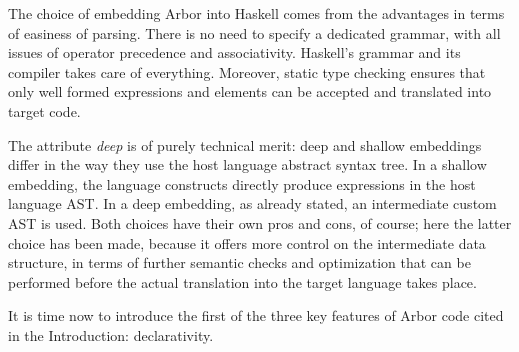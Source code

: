 \documentclass[12pt]{article} %
\newcommand{\abs}{abstract syntax tree}
\newcommand{\ABS}{AST}
\newcommand{\A}{Arbor}
\newcommand{\Hs}{Haskell}
\begin{document}
The choice of embedding \A{} into \Hs{} comes from the advantages in terms of easiness of parsing. There is no need to specify a dedicated grammar, with all issues of operator precedence and associativity. \Hs{}'s grammar and its compiler takes care of everything. Moreover, static type checking ensures that only well formed expressions and elements can be accepted and translated into target code.

The attribute \emph{deep} is of purely technical merit: deep and shallow embeddings differ in the way they use the host language \abs{}. In a shallow embedding, the language constructs directly produce expressions in the host language \ABS{}. In a deep embedding, as already stated, an intermediate custom \ABS{} is used. Both choices have their own pros and cons, of course; here the latter choice has been made, because it offers more control on the intermediate data structure, in terms of further semantic checks and optimization that can be performed before the actual translation into the target language takes place.

It is time now to introduce the first of the three key features of \A{} code cited in the Introduction: declarativity.\\
\end{document}
